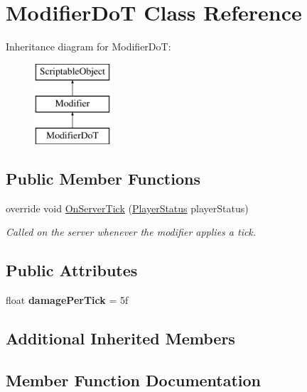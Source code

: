 \hypertarget{class_modifier_do_t}{}\section{Modifier\+DoT Class Reference}
\label{class_modifier_do_t}
Inheritance diagram for Modifier\+DoT\+:\begin{figure}[H]
\begin{center}
\leavevmode
\includegraphics[height=3.000000cm]{class_modifier_do_t}
\end{center}
\end{figure}
\subsection*{Public Member Functions}
\begin{DoxyCompactItemize}
\item 
override void \hyperlink{class_modifier_do_t_ae743a2ff9e1a200e2b1308e38386adcf}{On\+Server\+Tick} (\hyperlink{class_player_status}{Player\+Status} player\+Status)
\begin{DoxyCompactList}\small\item\em Called on the server whenever the modifier applies a tick. \end{DoxyCompactList}\end{DoxyCompactItemize}
\subsection*{Public Attributes}
\begin{DoxyCompactItemize}
\item 
\hypertarget{class_modifier_do_t_a2599d41f86d57b60f7fb1e70d37d4922}{}\label{class_modifier_do_t_a2599d41f86d57b60f7fb1e70d37d4922} 
float {\bfseries damage\+Per\+Tick} = 5f
\end{DoxyCompactItemize}
\subsection*{Additional Inherited Members}


\subsection{Member Function Documentation}
\hypertarget{class_modifier_do_t_ae743a2ff9e1a200e2b1308e38386adcf}{}\label{class_modifier_do_t_ae743a2ff9e1a200e2b1308e38386adcf} 
